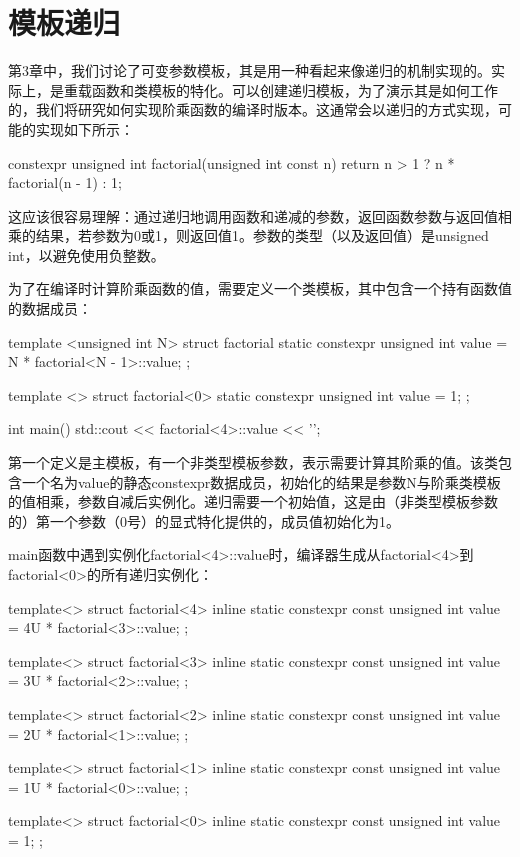 \section{模板递归}
第3章中，我们讨论了可变参数模板，其是用一种看起来像递归的机制实现的。实际上，是重载函数和类模板的特化。可以创建递归模板，为了演示其是如何工作的，我们将研究如何实现阶乘函数的编译时版本。这通常会以递归的方式实现，可能的实现如下所示：

\begin{cpp}
constexpr unsigned int factorial(unsigned int const n)
{
	return n > 1 ? n * factorial(n - 1) : 1;
}
\end{cpp}

这应该很容易理解：通过递归地调用函数和递减的参数，返回函数参数与返回值相乘的结果，若参数为0或1，则返回值1。参数的类型（以及返回值）是unsigned int，以避免使用负整数。

为了在编译时计算阶乘函数的值，需要定义一个类模板，其中包含一个持有函数值的数据成员：

\begin{cpp}
template <unsigned int N>
struct factorial
{
	static constexpr unsigned int value =
		N * factorial<N - 1>::value;
};

template <>
struct factorial<0>
{
	static constexpr unsigned int value = 1;
};

int main()
{
	std::cout << factorial<4>::value << '\n';
}
\end{cpp}

第一个定义是主模板，有一个非类型模板参数，表示需要计算其阶乘的值。该类包含一个名为value的静态constexpr数据成员，初始化的结果是参数N与阶乘类模板的值相乘，参数自减后实例化。递归需要一个初始值，这是由（非类型模板参数的）第一个参数（0号）的显式特化提供的，成员值初始化为1。

main函数中遇到实例化factorial<4>::value时，编译器生成从factorial<4>到factorial<0>的所有递归实例化：

\begin{cpp}
template<>
struct factorial<4>
{
	inline static constexpr const unsigned int value =
		4U * factorial<3>::value;
};

template<>
struct factorial<3>
{
	inline static constexpr const unsigned int value =
		3U * factorial<2>::value;
};

template<>
struct factorial<2>
{
	inline static constexpr const unsigned int value =
		2U * factorial<1>::value;
};

template<>
struct factorial<1>
{
	inline static constexpr const unsigned int value =
		1U * factorial<0>::value;
};

template<>
struct factorial<0>
{
	inline static constexpr const unsigned int value = 1;
};
\end{cpp}

